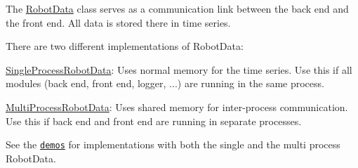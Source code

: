 The \hyperlink{classrobot__interfaces_1_1RobotData}{Robot\+Data} class serves as a communication link between the back end and the front end. All data is stored there in time series.

There are two different implementations of {\ttfamily Robot\+Data}\+:


\begin{DoxyItemize}
\item \hyperlink{classrobot__interfaces_1_1SingleProcessRobotData}{Single\+Process\+Robot\+Data}\+: Uses normal memory for the time series. Use this if all modules (back end, front end, logger, ...) are running in the same process.
\item \hyperlink{classrobot__interfaces_1_1MultiProcessRobotData}{Multi\+Process\+Robot\+Data}\+: Uses shared memory for inter-\/process communication. Use this if back end and front end are running in separate processes.
\end{DoxyItemize}

See the \href{https://github.com/open-dynamic-robot-initiative/robot_interfaces/blob/master/demos}{\tt demos} for implementations with both the single and the multi process Robot\+Data. 